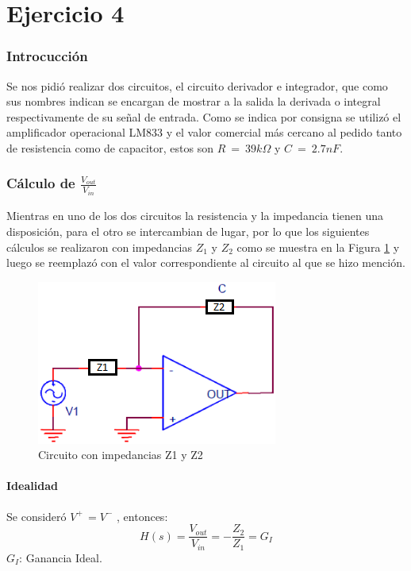 \documentclass[11pt, a4paper]{article}
\begin{document}
\part*{Ejercicio 4}
\section{Introcucción}
	Se nos pidió realizar dos circuitos, el circuito derivador e integrador, que como sus nombres indican se encargan de mostrar a la salida la derivada  o integral respectivamente de su señal de entrada.
	Como se indica por consigna se utilizó el amplificador operacional LM833 y el valor comercial más cercano al pedido tanto de resistencia como de capacitor, estos son $R \ = \ 39k \Omega$ y $C \ = \ 2.7 nF$.

\section{Cálculo de $\frac{V_{out}}{V_{in}}$}
Mientras en uno de los dos circuitos la resistencia y la impedancia tienen una disposición, para el otro se intercambian de lugar, por lo que los siguientes cálculos se realizaron con impedancias $Z_1$ y $Z_2 $ como se muestra en la Figura \ref{fig:circconz1z2} y luego se reemplazó con el valor correspondiente al circuito al que se hizo mención.

\begin{figure}[H]
\centering
\includegraphics[scale=0.5]{circconz1z2.png}
\caption{Circuito con impedancias Z1 y Z2}
\label{fig:circconz1z2}
\end{figure}

\subsection{Idealidad}
Se consideró $V^+\,=V^-$ , entonces:
\begin{equation}
	H(s) = \dfrac{V_{out}}{V_{in}} = - \dfrac{Z_2}{Z_1} = G_I
	\label{eq:gananciaideal}
\end{equation}
$G_I$: Ganancia Ideal.
\end{document}

